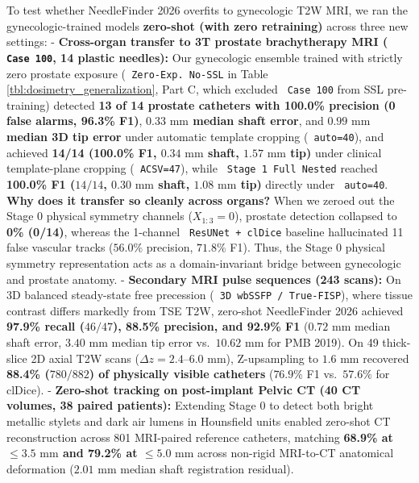 \documentclass[
  11pt,
]{article}
\let\nforigtexttt\texttt
\renewcommand{\texttt}[1]{\nforigtexttt{\XeTeXinterchartokenstate=1 #1}}
\begin{document}
To test whether NeedleFinder 2026 overfits to gynecologic T2W MRI, we
ran the gynecologic-trained models \textbf{zero-shot (with zero
retraining)} across three new settings: - \textbf{Cross-organ transfer
to 3T prostate brachytherapy MRI (\texttt{Case\ 100}, 14 plastic
needles):} Our gynecologic ensemble trained with strictly zero prostate
exposure (\texttt{Zero-Exp.\ No-SSL} in Table
\ref{tbl:dosimetry_generalization}, Part C, which excluded
\texttt{Case\ 100} from SSL pre-training) detected \textbf{13 of 14
prostate catheters with 100.0\% precision (0 false alarms, 96.3\% F1)},
\textbf{\(0.33\text{ mm}\) median shaft error}, and
\textbf{\(0.99\text{ mm}\) median 3D tip error} under automatic template
cropping (\texttt{auto=40}), and achieved \textbf{14/14 (100.0\% F1,
\(0.34\text{ mm}\) shaft, \(1.57\text{ mm}\) tip)} under clinical
template-plane cropping (\texttt{ACSV=47}), while
\texttt{Stage\ 1\ Full\ Nested} reached \textbf{100.0\% F1 (\(14/14\),
\(0.30\text{ mm}\) shaft, \(1.08\text{ mm}\) tip)} directly under
\texttt{auto=40}. \textbf{Why does it transfer so cleanly across
organs?} When we zeroed out the Stage 0 physical symmetry channels
(\(X_{1:3}=0\)), prostate detection collapsed to \textbf{0\% (0/14)},
whereas the 1-channel \texttt{ResUNet\ +\ clDice} baseline hallucinated
11 false vascular tracks (\(56.0\%\) precision, \(71.8\%\) F1). Thus,
the Stage 0 physical symmetry representation acts as a domain-invariant
bridge between gynecologic and prostate anatomy. - \textbf{Secondary MRI
pulse sequences (243 scans):} On 3D balanced steady-state free
precession (\texttt{3D\ wbSSFP\ /\ True-FISP}), where tissue contrast
differs markedly from TSE T2W, zero-shot NeedleFinder 2026 achieved
\textbf{97.9\% recall (\(46/47\)), 88.5\% precision, and 92.9\% F1}
(\(0.72\text{ mm}\) median shaft error, \(3.40\text{ mm}\) median tip
error vs.~\(10.62\text{ mm}\) for PMB 2019). On 49 thick-slice 2D axial
T2W scans (\(\Delta z = 2.4\text{--}6.0\text{ mm}\)), Z-upsampling to
\(1.6\text{ mm}\) recovered \textbf{88.4\% (\(780/882\)) of physically
visible catheters} (\(76.9\%\) F1 vs.~\(57.6\%\) for clDice). -
\textbf{Zero-shot tracking on post-implant Pelvic CT (40 CT volumes, 38
paired patients):} Extending Stage 0 to detect both bright metallic
stylets and dark air lumens in Hounsfield units enabled zero-shot CT
reconstruction across 801 MRI-paired reference catheters, matching
\textbf{68.9\% at \(\le 3.5\text{ mm}\) and 79.2\% at
\(\le 5.0\text{ mm}\)} across non-rigid MRI-to-CT anatomical deformation
(\(2.01\text{ mm}\) median shaft registration residual).
\end{document}
